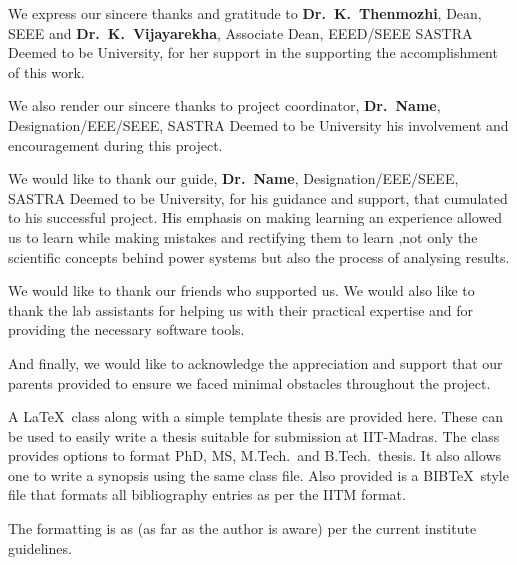 \documentclass[a4paper, 12pt, oneside]{sastra1}
\begin{document}
	\par We express our sincere thanks and gratitude to \textbf{Dr.~K.~Thenmozhi}, Dean, SEEE and \textbf{Dr.~K.~Vijayarekha}, Associate Dean, EEED/SEEE SASTRA Deemed to be University, for her support in the supporting the accomplishment of this work.
	
	\par We also render our sincere thanks to project coordinator, \textbf{Dr.~Name}, Designation/EEE/SEEE, SASTRA Deemed to be University his involvement and encouragement during this project.
	
	\par We would like to thank our guide, \textbf{Dr.~Name}, Designation/EEE/SEEE, SASTRA Deemed to be University, for his guidance and support, that cumulated to his successful project. His emphasis on making learning an experience allowed us to learn while making mistakes and rectifying them to learn ,not only the scientific concepts behind power systems but also the process of analysing results.
	
	\par We would like to thank our friends who supported us. We would also like to thank the lab assistants for helping us with their practical expertise and for providing the necessary software tools.
	
	\par And finally, we would like to acknowledge the appreciation and support that our parents provided to ensure we faced minimal obstacles throughout the project.
	\pagebreak
	
	\abstract

\begin{doublespace}
	\linespread{2}
	\vspace*{24pt}
	
	\noindent A \LaTeX\ class along with a simple template thesis are provided here.  These can be used to easily write a thesis suitable for submission at IIT-Madras.  The class provides options to format PhD, MS, M.Tech.\ and B.Tech.\ thesis.  It also allows one to write a synopsis using the same class file.  Also provided is a BIB\TeX\ style file that formats all bibliography entries as per the IITM format.
	
	The formatting is as (as far as the author is aware) per the current institute guidelines.
	
\end{doublespace}
\pagebreak
	
\end{document}
